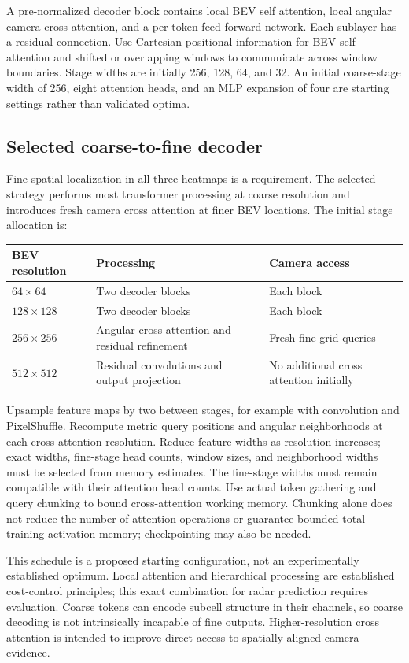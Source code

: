 \documentclass[11pt,a4paper]{article}
\begin{document}
A pre-normalized decoder block contains local BEV self attention, local angular camera cross attention, and a per-token feed-forward network. Each sublayer has a residual connection. Use Cartesian positional information for BEV self attention and shifted or overlapping windows to communicate across window boundaries. Stage widths are initially 256, 128, 64, and 32. An initial coarse-stage width of 256, eight attention heads, and an MLP expansion of four are starting settings rather than validated optima.

\subsection{Selected coarse-to-fine decoder}
Fine spatial localization in all three heatmaps is a requirement. The selected strategy performs most transformer processing at coarse resolution and introduces fresh camera cross attention at finer BEV locations. The initial stage allocation is:
\begin{center}
\begin{tabular}{lll}
\hline
BEV resolution & Processing & Camera access \\
\hline
$64\times64$ & Two decoder blocks & Each block \\
$128\times128$ & Two decoder blocks & Each block \\
$256\times256$ & Angular cross attention and residual refinement & Fresh fine-grid queries \\
$512\times512$ & Residual convolutions and output projection & No additional cross attention initially \\
\hline
\end{tabular}
\end{center}

Upsample feature maps by two between stages, for example with convolution and PixelShuffle. Recompute metric query positions and angular neighborhoods at each cross-attention resolution. Reduce feature widths as resolution increases; exact widths, fine-stage head counts, window sizes, and neighborhood widths must be selected from memory estimates. The fine-stage widths must remain compatible with their attention head counts. Use actual token gathering and query chunking to bound cross-attention working memory. Chunking alone does not reduce the number of attention operations or guarantee bounded total training activation memory; checkpointing may also be needed.

This schedule is a proposed starting configuration, not an experimentally established optimum. Local attention and hierarchical processing are established cost-control principles; this exact combination for radar prediction requires evaluation. Coarse tokens can encode subcell structure in their channels, so coarse decoding is not intrinsically incapable of fine outputs. Higher-resolution cross attention is intended to improve direct access to spatially aligned camera evidence.
\end{document}
